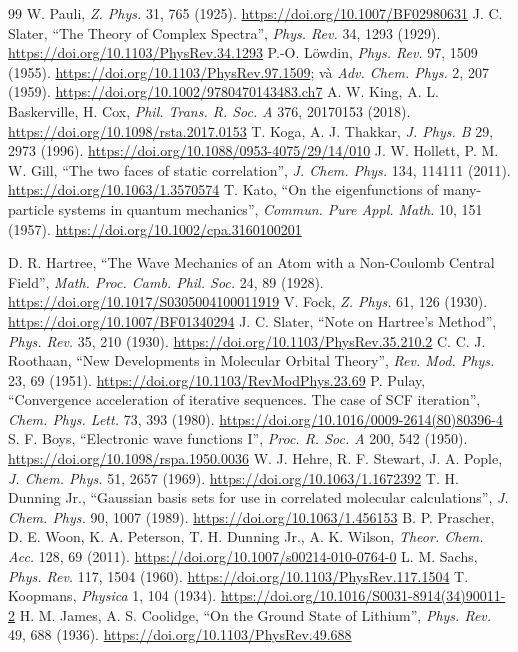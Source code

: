 {\begin{thebibliography}{99}
 W. Pauli, \emph{Z. Phys.} 31, 765 (1925). \url{https://doi.org/10.1007/BF02980631}
 J. C. Slater, ``The Theory of Complex Spectra'', \emph{Phys. Rev.} 34, 1293 (1929). \url{https://doi.org/10.1103/PhysRev.34.1293}
 P.-O. Löwdin, \emph{Phys. Rev.} 97, 1509 (1955). \url{https://doi.org/10.1103/PhysRev.97.1509}; và \emph{Adv. Chem. Phys.} 2, 207 (1959). \url{https://doi.org/10.1002/9780470143483.ch7}
 A. W. King, A. L. Baskerville, H. Cox, \emph{Phil. Trans. R. Soc. A} 376, 20170153 (2018). \url{https://doi.org/10.1098/rsta.2017.0153}
 T. Koga, A. J. Thakkar, \emph{J. Phys. B} 29, 2973 (1996). \url{https://doi.org/10.1088/0953-4075/29/14/010}
 J. W. Hollett, P. M. W. Gill, ``The two faces of static correlation'', \emph{J. Chem. Phys.} 134, 114111 (2011). \url{https://doi.org/10.1063/1.3570574}
 T. Kato, ``On the eigenfunctions of many-particle systems in quantum mechanics'', \emph{Commun. Pure Appl. Math.} 10, 151 (1957). \url{https://doi.org/10.1002/cpa.3160100201}

 D. R. Hartree, ``The Wave Mechanics of an Atom with a Non-Coulomb Central Field'', \emph{Math. Proc. Camb. Phil. Soc.} 24, 89 (1928). \url{https://doi.org/10.1017/S0305004100011919}
 V. Fock, \emph{Z. Phys.} 61, 126 (1930). \url{https://doi.org/10.1007/BF01340294}
 J. C. Slater, ``Note on Hartree's Method'', \emph{Phys. Rev.} 35, 210 (1930). \url{https://doi.org/10.1103/PhysRev.35.210.2}
 C. C. J. Roothaan, ``New Developments in Molecular Orbital Theory'', \emph{Rev. Mod. Phys.} 23, 69 (1951). \url{https://doi.org/10.1103/RevModPhys.23.69}
 P. Pulay, ``Convergence acceleration of iterative sequences. The case of SCF iteration'', \emph{Chem. Phys. Lett.} 73, 393 (1980). \url{https://doi.org/10.1016/0009-2614(80)80396-4}
 S. F. Boys, ``Electronic wave functions I'', \emph{Proc. R. Soc. A} 200, 542 (1950). \url{https://doi.org/10.1098/rspa.1950.0036}
 W. J. Hehre, R. F. Stewart, J. A. Pople, \emph{J. Chem. Phys.} 51, 2657 (1969). \url{https://doi.org/10.1063/1.1672392}
 T. H. Dunning Jr., ``Gaussian basis sets for use in correlated molecular calculations'', \emph{J. Chem. Phys.} 90, 1007 (1989). \url{https://doi.org/10.1063/1.456153}
 B. P. Prascher, D. E. Woon, K. A. Peterson, T. H. Dunning Jr., A. K. Wilson, \emph{Theor. Chem. Acc.} 128, 69 (2011). \url{https://doi.org/10.1007/s00214-010-0764-0}
 L. M. Sachs, \emph{Phys. Rev.} 117, 1504 (1960). \url{https://doi.org/10.1103/PhysRev.117.1504}
 T. Koopmans, \emph{Physica} 1, 104 (1934). \url{https://doi.org/10.1016/S0031-8914(34)90011-2}
 H. M. James, A. S. Coolidge, ``On the Ground State of Lithium'', \emph{Phys. Rev.} 49, 688 (1936). \url{https://doi.org/10.1103/PhysRev.49.688}


\end{thebibliography}}

